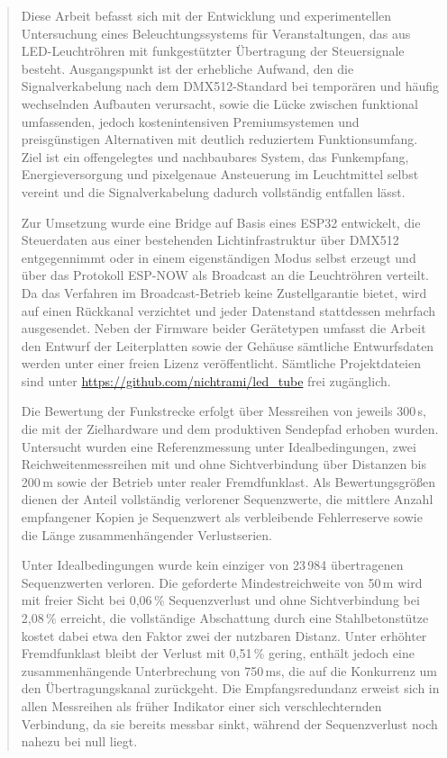 \begin{abstract}
Diese Arbeit befasst sich mit der Entwicklung und experimentellen Untersuchung eines Beleuchtungssystems für Veranstaltungen, das aus LED-Leuchtröhren mit funkgestützter Übertragung der Steuersignale besteht.
Ausgangspunkt ist der erhebliche Aufwand, den die Signalverkabelung nach dem DMX512-Standard bei temporären und häufig wechselnden Aufbauten verursacht, sowie die Lücke zwischen funktional umfassenden, jedoch kostenintensiven Premiumsystemen und preisgünstigen Alternativen mit deutlich reduziertem Funktionsumfang.
Ziel ist ein offengelegtes und nachbaubares System, das Funkempfang, Energieversorgung und pixelgenaue Ansteuerung im Leuchtmittel selbst vereint und die Signalverkabelung dadurch vollständig entfallen lässt.

Zur Umsetzung wurde eine Bridge auf Basis eines ESP32 entwickelt, die Steuerdaten aus einer bestehenden Lichtinfrastruktur über DMX512 entgegennimmt oder in einem eigenständigen Modus selbst erzeugt und über das Protokoll ESP-NOW als Broadcast an die Leuchtröhren verteilt.
Da das Verfahren im Broadcast-Betrieb keine Zustellgarantie bietet, wird auf einen Rückkanal verzichtet und jeder Datenstand stattdessen mehrfach ausgesendet.
Neben der Firmware beider Gerätetypen umfasst die Arbeit den Entwurf der Leiterplatten sowie der Gehäuse sämtliche Entwurfsdaten werden unter einer freien Lizenz veröffentlicht.
Sämtliche Projektdateien sind unter \url{https://github.com/nichtrami/led_tube} frei zugänglich.

Die Bewertung der Funkstrecke erfolgt über Messreihen von jeweils 300\,s, die mit der Zielhardware und dem produktiven Sendepfad erhoben wurden.
Untersucht wurden eine Referenzmessung unter Idealbedingungen, zwei Reichweitenmessreihen mit und ohne Sichtverbindung über Distanzen bis 200\,m sowie der Betrieb unter realer Fremdfunklast.
Als Bewertungsgrößen dienen der Anteil vollständig verlorener Sequenzwerte, die mittlere Anzahl empfangener Kopien je Sequenzwert als verbleibende Fehlerreserve sowie die Länge zusammenhängender Verlustserien.

Unter Idealbedingungen wurde kein einziger von 23\,984 übertragenen Sequenzwerten verloren.
Die geforderte Mindestreichweite von 50\,m wird mit freier Sicht bei 0,06\,\% Sequenzverlust und ohne Sichtverbindung bei 2,08\,\% erreicht, die vollständige Abschattung durch eine Stahlbetonstütze kostet dabei etwa den Faktor zwei der nutzbaren Distanz.
Unter erhöhter Fremdfunklast bleibt der Verlust mit 0,51\,\% gering, enthält jedoch eine zusammenhängende Unterbrechung von 750\,ms, die auf die Konkurrenz um den Übertragungskanal zurückgeht.
Die Empfangsredundanz erweist sich in allen Messreihen als früher Indikator einer sich verschlechternden Verbindung, da sie bereits messbar sinkt, während der Sequenzverlust noch nahezu bei null liegt.


\end{abstract}
